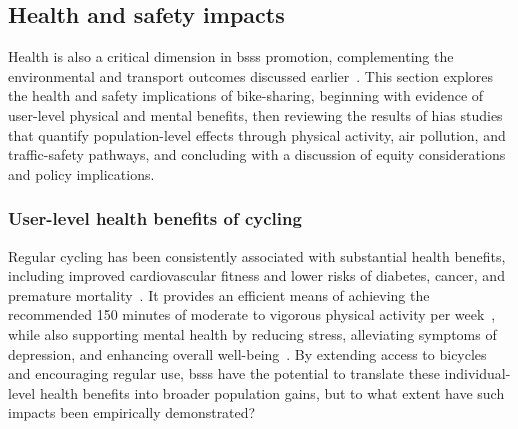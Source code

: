 \subsection{Health and safety impacts}

Health is also a critical dimension in \acp{bss} promotion, complementing the environmental and transport outcomes discussed earlier~\cite{DeMaio2009, Fishman2016, Qiu2018}. This section explores the health and safety implications of bike-sharing, beginning with evidence of user-level physical and mental benefits, then reviewing the results of \acp{hia} studies that quantify population-level effects through physical activity, air pollution, and traffic-safety pathways, and concluding with a discussion of equity considerations and policy implications.

    \subsubsection{User-level health benefits of cycling}

    Regular cycling has been consistently associated with substantial health benefits, including improved cardiovascular fitness and lower risks of diabetes, cancer, and premature mortality~\cite{Green2021, Celis-Morales2017, Dutheil2020}. It provides an efficient means of achieving the recommended 150 minutes of moderate to vigorous physical activity per week~\cite{Knowler2002}, while also supporting mental health by reducing stress, alleviating symptoms of depression, and enhancing overall well-being~\cite{Chekroud2018, Ruiz2015}. By extending access to bicycles and encouraging regular use, \acp{bss} have the potential to translate these individual-level health benefits into broader population gains, but to what extent have such impacts been empirically demonstrated?

